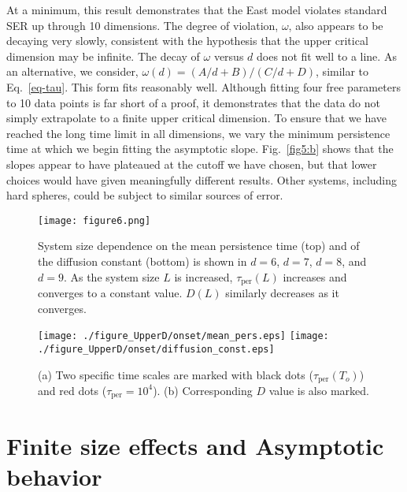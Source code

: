 \documentclass[showpacs,pre,aps,twocolumn,superscriptaddress]{revtex4-1}
\begin{document}
At a minimum, this result demonstrates that the East model violates standard SER up through 10 dimensions. The degree of violation, $\omega$, also appears to be decaying very slowly, consistent with the hypothesis that the upper critical dimension may be infinite. The decay of $\omega$ versus $d$ does not fit well to a line. As an alternative, we consider, 
$\omega(d) = (A/d+B)/(C/d+D)$, similar to Eq.~\ref{eq-tau}.  This form fits reasonably well. Although fitting four free parameters to 10 data points is far short of a proof, it demonstrates that the data do not simply extrapolate to a finite upper critical dimension. To ensure that we have reached the long time limit in all dimensions, we vary the minimum persistence time at which we begin fitting the asymptotic slope. Fig.~\ref{fig5:b} shows that the slopes appear to have plateaued at the cutoff we have chosen, but that lower choices would have given meaningfully different results. Other systems, including hard spheres, could be subject to similar sources of error. 



\begin{figure*}[t]
\texttt{[image: figure6.png]}
\caption{\label{fig6} 
System size dependence on the mean persistence time (top) and of the diffusion constant (bottom) is shown in $d=6$, $d=7$, $d=8$, and $d=9$. As the system size $L$ is increased, $\tau_{\text{per}}(L)$ increases and converges to a constant value.  
$D(L)$ similarly decreases as it converges.
}
\end{figure*}


\begin{figure}[t]
 \begin{center}
\texttt{[image: ./figure\_UpperD/onset/mean\_pers.eps]}
\texttt{[image: ./figure\_UpperD/onset/diffusion\_const.eps]}
 \end{center}
 \caption{\label{fig8} (a) Two specific time scales are marked with black dots ($\tau_{\text{per}}(T_o)$) and red dots ($\tau_{\text{per}}=10^4$).
				(b) Corresponding $D$ value is also marked.
               }

\end{figure}



\section{Finite size effects and Asymptotic behavior}
\end{document}
